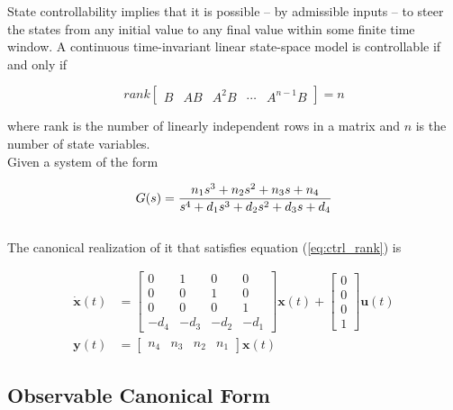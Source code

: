 \documentclass[10pt,conference,compsoc]{IEEEtran}
\newcommand{\mtx}[1] {\bm #1}
\begin{document}
State controllability implies that it is possible -- by admissible inputs -- to
steer the \glspl{state} from any initial value to any final value within some
finite time window. A continuous \gls{time-invariant} linear state-space model
is controllable if and only if

\begin{equation}
  rank \left[
  \begin{array}{ccccc}
    B & AB & A^2B & \cdots & A^{n-1}B
  \end{array}
  \right] = n
  \label{eq:ctrl_rank}
\end{equation}

where rank is the number of linearly independent rows in a matrix and $n$ is the
number of \gls{state} variables. \\

Given a \gls{system} of the form

\begin{equation} \label{eq:ctrl_obsv_tf}
  G(s) = \frac{n_1 s^3 + n_2 s^2 + n_3 s + n_4}
    {s^4 + d_1 s^3 + d_2 s^2 + d_3 s + d_4} \\
\end{equation}
\\
The canonical realization of it that satisfies equation (\ref{eq:ctrl_rank}) is

\begin{align}
  \dot{\mtx{x}}(t) &= \left[
  \begin{array}{cccc}
    0 & 1 & 0 & 0 \\
    0 & 0 & 1 & 0 \\
    0 & 0 & 0 & 1 \\
    -d_4 & -d_3 & -d_2 & -d_1
  \end{array}
  \right] \mtx{x}(t) + \left[
  \begin{array}{c}
    0 \\
    0 \\
    0 \\
    1
  \end{array}
  \right] \mtx{u}(t) \\
  \mtx{y}(t) &= \left[
  \begin{array}{cccc}
    n_4 & n_3 & n_2 & n_1
  \end{array}
  \right] \mtx{x}(t)
\end{align}

\subsection{Observable Canonical Form} \label{subsec:obsv_canon}
\end{document}
